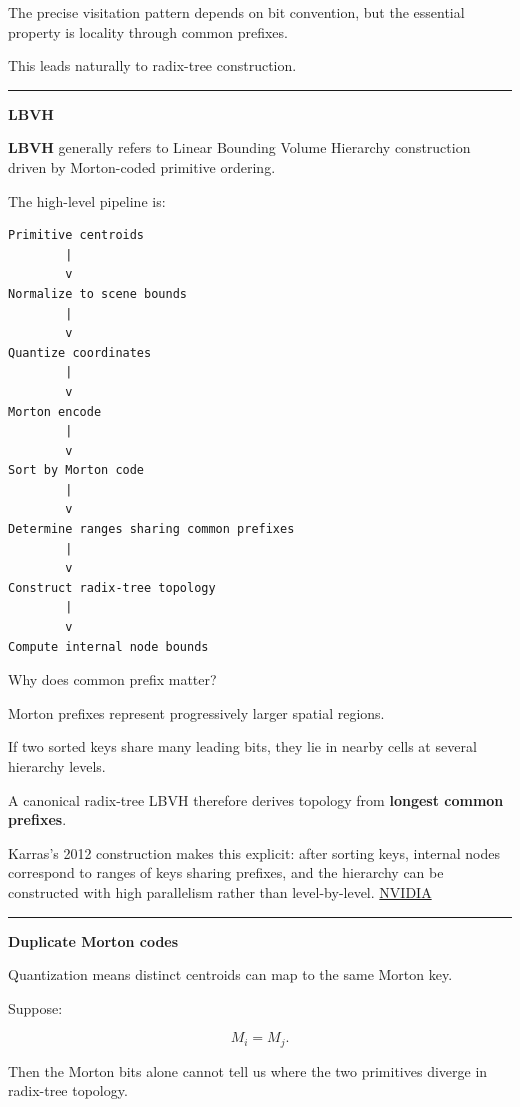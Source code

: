 The precise visitation pattern depends on bit convention, but the essential property is locality through common prefixes.

This leads naturally to radix-tree construction.

\begin{center}\rule{0.5\linewidth}{0.5pt}\end{center}

\textbf{LBVH}

\textbf{LBVH} generally refers to Linear Bounding Volume Hierarchy construction driven by Morton-coded primitive ordering.

The high-level pipeline is:

\begin{verbatim}
Primitive centroids
        |
        v
Normalize to scene bounds
        |
        v
Quantize coordinates
        |
        v
Morton encode
        |
        v
Sort by Morton code
        |
        v
Determine ranges sharing common prefixes
        |
        v
Construct radix-tree topology
        |
        v
Compute internal node bounds
\end{verbatim}

Why does common prefix matter?

Morton prefixes represent progressively larger spatial regions.

If two sorted keys share many leading bits, they lie in nearby cells at several hierarchy levels.

A canonical radix-tree LBVH therefore derives topology from \textbf{longest common prefixes}.

Karras's 2012 construction makes this explicit: after sorting keys, internal nodes correspond to ranges of keys sharing prefixes, and the hierarchy can be constructed with high parallelism rather than level-by-level. \href{https://research.nvidia.com/publication/2012-06_maximizing-parallelism-construction-bvhs-octrees-and-k-d-trees?utm_source=chatgpt.com}{NVIDIA}

\begin{center}\rule{0.5\linewidth}{0.5pt}\end{center}

\textbf{Duplicate Morton codes}

Quantization means distinct centroids can map to the same Morton key.

Suppose:

\[
M_i=M_j.
\]

Then the Morton bits alone cannot tell us where the two primitives diverge in radix-tree topology.

